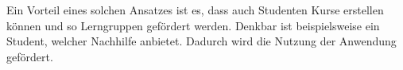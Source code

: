 Ein Vorteil eines solchen Ansatzes ist es, dass auch Studenten Kurse erstellen können und so Lerngruppen gefördert werden.
Denkbar ist beispielsweise ein Student, welcher Nachhilfe anbietet.
Dadurch wird die Nutzung der Anwendung gefördert.









